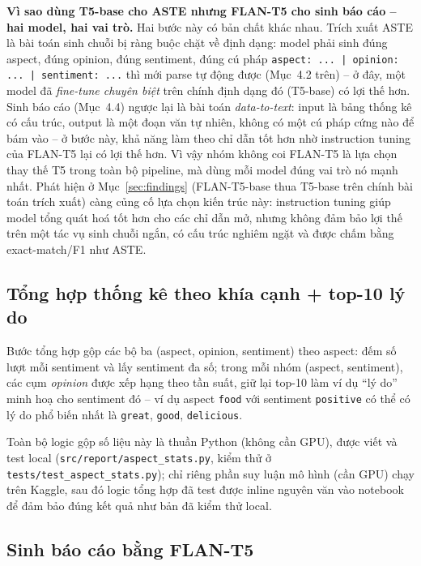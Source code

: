\documentclass[11pt,a4paper]{article}
\begin{document}
\textbf{Vì sao dùng T5-base cho ASTE nhưng FLAN-T5 cho sinh báo cáo --
hai model, hai vai trò.} Hai bước này có bản chất khác nhau. Trích xuất
ASTE là bài toán sinh chuỗi bị ràng buộc chặt về định dạng: model phải
sinh đúng aspect, đúng opinion, đúng sentiment, đúng cú pháp
\texttt{aspect: ... | opinion: ... | sentiment: ...} thì mới parse tự
động được (Mục~4.2 trên) -- ở đây, một model đã \emph{fine-tune chuyên
biệt} trên chính định dạng đó (T5-base) có lợi thế hơn. Sinh báo cáo
(Mục~4.4) ngược lại là bài toán \emph{data-to-text}: input là bảng thống
kê có cấu trúc, output là một đoạn văn tự nhiên, không có một cú pháp
cứng nào để bám vào -- ở bước này, khả năng làm theo chỉ dẫn tốt hơn nhờ
instruction tuning của FLAN-T5 lại có lợi thế hơn. Vì vậy nhóm không coi
FLAN-T5 là lựa chọn thay thế T5 trong toàn bộ pipeline, mà dùng mỗi model
đúng vai trò nó mạnh nhất. Phát hiện ở Mục~\ref{sec:findings} (FLAN-T5-base
thua T5-base trên chính bài toán trích xuất) càng củng cố lựa chọn kiến
trúc này: instruction tuning giúp model tổng quát hoá tốt hơn cho các chỉ
dẫn mở, nhưng không đảm bảo lợi thế trên một tác vụ sinh chuỗi ngắn, có
cấu trúc nghiêm ngặt và được chấm bằng exact-match/F1 như ASTE.

\subsection{Tổng hợp thống kê theo khía cạnh + top-10 lý do}

Bước tổng hợp gộp các bộ ba (aspect, opinion, sentiment) theo aspect: đếm
số lượt mỗi sentiment và lấy sentiment đa số; trong mỗi nhóm
(aspect, sentiment), các cụm \emph{opinion} được xếp hạng theo tần suất, giữ
lại top-10 làm ví dụ ``lý do'' minh hoạ cho sentiment đó -- ví dụ aspect
\texttt{food} với sentiment \texttt{positive} có thể có lý do phổ biến nhất
là \texttt{great}, \texttt{good}, \texttt{delicious}.

Toàn bộ logic gộp số liệu này là thuần Python (không cần GPU), được viết và
test local (\texttt{src/\allowbreak report/\allowbreak aspect\_\allowbreak stats.py}, kiểm thử ở
\texttt{tests/\allowbreak test\_\allowbreak aspect\_\allowbreak stats.py}); chỉ riêng phần suy luận mô hình
(cần GPU) chạy trên Kaggle, sau đó logic tổng hợp đã test được inline
nguyên văn vào notebook để đảm bảo đúng kết quả như bản đã kiểm thử local.

\subsection{Sinh báo cáo bằng FLAN-T5}
\label{sec:flant5report}
\end{document}
